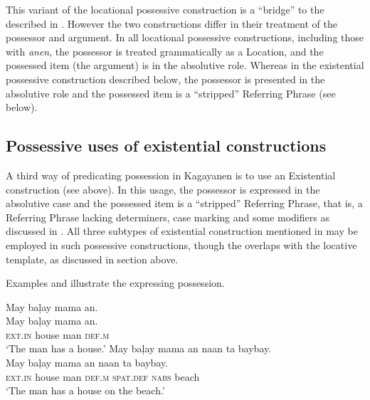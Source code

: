  This variant of the locational possessive construction is a “bridge” to the  described in . However the two constructions differ in their treatment of the possessor and argument. In all locational possessive constructions, including those with \textit{anen}, the possessor is treated grammatically as a Location, and the possessed item (the argument) is in the absolutive role. Whereas in the existential possessive construction described below, the possessor is presented in the absolutive role and the possessed item is a “stripped” Referring Phrase (see  below).

\subsection{Possessive uses of existential constructions}
\label{sec:existentialpossession}

A third way of predicating possession in Kagayanen is to use an Existential construction (see  above). In this usage, the possessor is expressed in the absolutive case and the possessed item is a “stripped” Referring Phrase, that is, a Referring Phrase lacking determiners, case marking and some modifiers as discussed in . All three subtypes of existential construction mentioned in  may be employed  in such possessive constructions, though the  overlaps with the locative template, as discussed in section  above.

Examples  and  illustrate the  expressing possession.
 
\ea
\label{ex:manhashouse}
May  baļay  mama  an. \\\smallskip \gll May  baļay  mama  an. \\
\textsc{ext.in}  house  man  \textsc{def.m} \\
\glt ‘The man has a house.’
\z
\ea
\label{ex:manhashouseonbeach}
May  baļay  mama  an  naan  ta  baybay. \\\smallskip \gll May  baļay  mama  an  naan  ta  baybay. \\
\textsc{ext.in}  house  man  \textsc{def.m}  \textsc{spat.def}  \textsc{nabs} beach \\
\glt ‘The man has a house on the beach.’
\z

